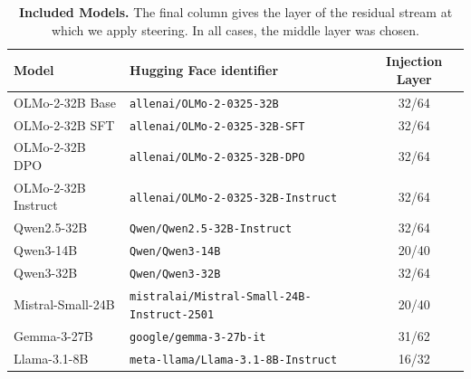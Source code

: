 \begin{table}[t]
\centering
\small
\begin{tabularx}{0.95\textwidth}{@{}lXc@{}}
\toprule
Model & Hugging Face identifier & Injection Layer \\
\midrule
OLMo-2-32B Base & \texttt{allenai/OLMo-2-0325-32B} & 32/64 \\
OLMo-2-32B SFT & \texttt{allenai/OLMo-2-0325-32B-SFT} & 32/64 \\
OLMo-2-32B DPO & \texttt{allenai/OLMo-2-0325-32B-DPO} & 32/64 \\
OLMo-2-32B Instruct & \texttt{allenai/OLMo-2-0325-32B-Instruct} & 32/64 \\
Qwen2.5-32B & \texttt{Qwen/Qwen2.5-32B-Instruct} & 32/64 \\
Qwen3-14B & \texttt{Qwen/Qwen3-14B} & 20/40 \\
Qwen3-32B & \texttt{Qwen/Qwen3-32B} & 32/64 \\
Mistral-Small-24B & \texttt{mistralai/Mistral-Small-24B-Instruct-2501} & 20/40 \\
Gemma-3-27B & \texttt{google/gemma-3-27b-it} & 31/62 \\
Llama-3.1-8B & \texttt{meta-llama/Llama-3.1-8B-Instruct} & 16/32 \\
\bottomrule
\end{tabularx}
\vspace{3pt}
\caption{\textbf{Included Models.} The final column gives the layer of the residual stream at which we apply steering. In all cases, the middle layer was chosen.}
\label{tab:models}
\end{table}
